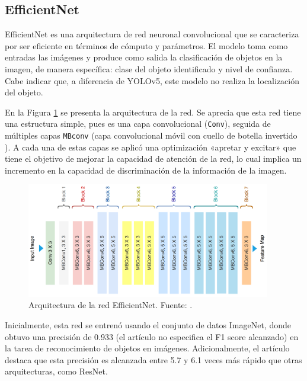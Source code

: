 \subsection{EfficientNet}

EfficientNet \cite{tan-2019} es una arquitectura de red neuronal convolucional que se caracteriza por ser eficiente en términos de cómputo y parámetros. El modelo toma como entradas las imágenes y produce como salida la clasificación de objetos en la imagen, de manera específica: clase del objeto identificado y nivel de confianza. Cabe indicar que, a diferencia de YOLOv5, este modelo no realiza la localización del objeto.

En la Figura \ref{fig:efficientnet} se presenta la arquitectura de la red. Se aprecia que esta red tiene una estructura simple, pues es una capa convolucional (\texttt{Conv}), seguida de múltiples capas \texttt{MBconv} (capa convolucional móvil con cuello de botella invertido \cite{sandler2019}). A cada una de estas capas se aplicó una optimización «apretar y excitar» que tiene el objetivo de mejorar la capacidad de atención de la red, lo cual implica un incremento en la capacidad de discriminación de la información de la imagen.

\begin{figure}[ht]
    \centering
    \includegraphics[width=0.95\textwidth]{Figuras/efficientnet.png}
    \caption[Arquitectura de la red EfficientNet.]{Arquitectura de la red EfficientNet. Fuente: \cite{ahmed2021}.}
    \label{fig:efficientnet}
\end{figure}

Inicialmente, esta red se entrenó usando el conjunto de datos ImageNet, donde obtuvo una precisión de 0.933 (el artículo no especifica el F1 score alcanzado) \cite{tan-2019} en la tarea de reconocimiento de objetos en imágenes. Adicionalmente, el artículo destaca que esta precisión es alcanzada entre 5.7 y 6.1 veces más rápido que otras arquitecturas, como ResNet.


